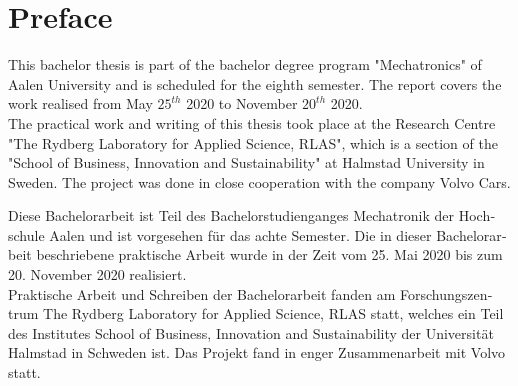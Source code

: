 \chapter*{Preface}
\label{preface}

This bachelor thesis is part of the bachelor degree program "Mechatronics" of Aalen University and is scheduled for the eighth semester. The report covers the work realised from May $ 25^{th} $ 2020 to November $ 20^{th} $ 2020.\\
The practical work and writing of this thesis took place at the Research Centre "The Rydberg Laboratory for Applied Science, RLAS", which is a section of the "School of Business, Innovation and Sustainability" at Halmstad University in Sweden. The project was done in close cooperation with the company Volvo Cars. 

\vspace*{25mm}

\begin{otherlanguage}{ngerman}
Diese Bachelorarbeit ist Teil des Bachelorstudienganges \glqq Mechatronik\grqq{} der Hochschule Aalen und ist vorgesehen für das achte Semester. Die in dieser Bachelorarbeit beschriebene praktische Arbeit wurde in der Zeit vom 25. Mai 2020 bis zum 20. November 2020 realisiert.\\
Praktische Arbeit und Schreiben der Bachelorarbeit fanden am Forschungszentrum \glqq The Rydberg Laboratory for Applied Science, RLAS\grqq{} statt, welches ein Teil des Institutes \glqq School of Business, Innovation and Sustainability\grqq{} der Universität Halmstad in Schweden ist. Das Projekt fand in enger Zusammenarbeit mit Volvo statt.
\end{otherlanguage}